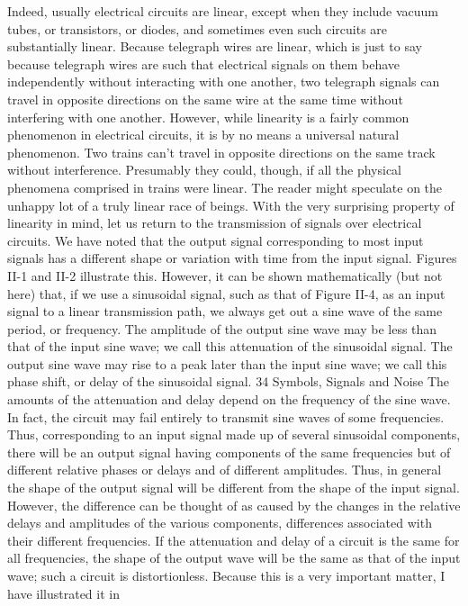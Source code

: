 Indeed, usually electrical circuits are linear, except when they
include vacuum tubes, or transistors, or diodes, and sometimes
even such circuits are substantially linear.
Because telegraph wires are linear, which is just to say because
telegraph wires are such that electrical signals on them behave
independently without interacting with one another, two telegraph
signals can travel in opposite directions on the same wire at the
same time without interfering with one another. However, while
linearity is a fairly common phenomenon in electrical circuits, it
is by no means a universal natural phenomenon. Two trains can’t
travel in opposite directions on the same track without interference.
Presumably they could, though, if all the physical phenomena
comprised in trains were linear. The reader might speculate on the
unhappy lot of a truly linear race of beings.
With the very surprising property of linearity in mind, let us
return to the transmission of signals over electrical circuits. We
have noted that the output signal corresponding to most input
signals has a different shape or variation with time from the input
signal. Figures II-1 and II-2 illustrate this. However, it can be
shown mathematically (but not here) that, if we use a sinusoidal
signal, such as that of Figure II-4, as an input signal to a linear
transmission path, we always get out a sine wave of the same
period, or frequency. The amplitude of the output sine wave may
be less than that of the input sine wave; we call this attenuation of
the sinusoidal signal. The output sine wave may rise to a peak later
than the input sine wave; we call this phase shift, or delay of the
sinusoidal signal.
34
Symbols, Signals and Noise
The amounts of the attenuation and delay depend on the frequency
of the sine wave. In fact, the circuit may fail entirely to
transmit sine waves of some frequencies. Thus, corresponding to
an input signal made up of several sinusoidal components, there
will be an output signal having components of the same frequencies
but of different relative phases or delays and of different amplitudes.
Thus, in general the shape of the output signal will be
different from the shape of the input signal. However, the difference
can be thought of as caused by the changes in the relative delays
and amplitudes of the various components, differences associated
with their different frequencies. If the attenuation and delay of a
circuit is the same for all frequencies, the shape of the output wave
will be the same as that of the input wave; such a circuit is
distortionless.
Because this is a very important matter, I have illustrated it in
